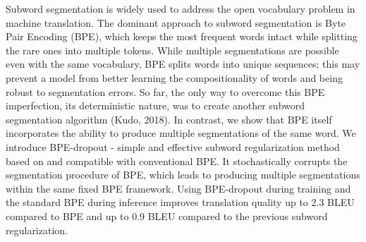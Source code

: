 Subword segmentation is widely used to address the open vocabulary problem in machine translation. The dominant approach to subword segmentation is Byte Pair Encoding (BPE), which keeps the most frequent words intact while splitting the rare ones into multiple tokens. While multiple segmentations are possible even with the same vocabulary, BPE splits words into unique sequences; this may prevent a model from better learning the compositionality of words and being robust to segmentation errors. So far, the only way to overcome this BPE imperfection, its deterministic nature, was to create another subword segmentation algorithm (Kudo, 2018). In contrast, we show that BPE itself incorporates the ability to produce multiple segmentations of the same word. We introduce BPE-dropout - simple and effective subword regularization method based on and compatible with conventional BPE. It stochastically corrupts the segmentation procedure of BPE, which leads to producing multiple segmentations within the same fixed BPE framework. Using BPE-dropout during training and the standard BPE during inference improves translation quality up to 2.3 BLEU compared to BPE and up to 0.9 BLEU compared to the previous subword regularization.
